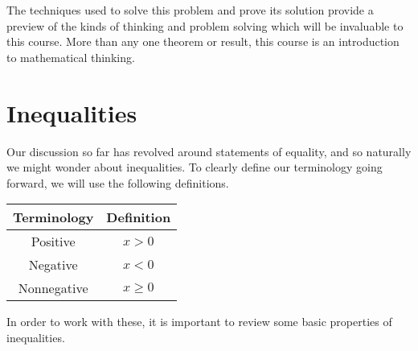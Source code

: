 \documentclass[twoside]{report}
\begin{document}
The techniques used to solve this problem and prove its solution provide a preview of the kinds of thinking and problem solving which will be invaluable to this course. More than any one theorem or result, this course is an introduction to mathematical thinking.

\section{Inequalities}

Our discussion so far has revolved around statements of equality, and so naturally we might wonder about inequalities. To clearly define our terminology going forward, we will use the following definitions.

\vspace{\baselineskip}
\begin{center}
	\begin{tabular}{cc}
		\toprule
		Terminology & Definition \\
		\midrule
		Positive & $x > 0$ \\
		Negative & $x < 0$ \\
		Nonnegative & $x \ge 0$ \\
		\bottomrule
	\end{tabular}
\end{center}
\vspace{\baselineskip}


In order to work with these, it is important to review some basic properties of inequalities.
\end{document}

